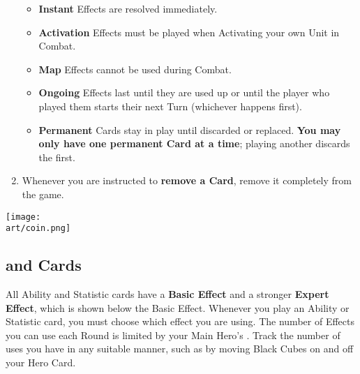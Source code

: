 \begin{multicols*}{2}
\begin{enumerate}
  \begin{itemize}
    \item \textbf{Instant}  Effects are resolved immediately.
    \item \textbf{Activation}  Effects must be played when Activating your own Unit in Combat.
    \item \textbf{Map}  Effects cannot be used during Combat.
    \item \textbf{Ongoing}  Effects last until they are used up or until the player who played them starts their next Turn (whichever happens first).
    \item \textbf{Permanent}  Cards stay in play until discarded or replaced.
      \textbf{You may only have one permanent Card at a time}; playing another discards the first.
  \end{itemize}
  \item Whenever you are instructed to \textbf{remove a Card}, remove it completely from the game.
\end{enumerate}

\vfill
\hfill{\texttt{[image: \\art/coin.png]}}

\clearpage

\subsection*{ and  Cards}

All Ability and Statistic cards have a \textbf{Basic Effect} and a stronger \textbf{Expert}  \textbf{Effect}, which is shown below the Basic Effect.
Whenever you play an Ability or Statistic card, you must choose which effect you are using.
The number of  Effects you can use each Round is limited by your Main Hero's .
Track the number of uses you have in any suitable manner, such as by moving Black Cubes on and off your Hero Card.\par
\bigskip


\end{multicols*}
